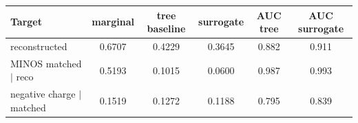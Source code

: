 \begin{tabular}{lccccc}
\toprule
Target & marginal & tree baseline & surrogate & AUC tree & AUC surrogate \\
\midrule
reconstructed & 0.6707 & 0.4229 & 0.3645 & 0.882 & 0.911 \\
MINOS matched $\mid$ reco & 0.5193 & 0.1015 & 0.0600 & 0.987 & 0.993 \\
negative charge $\mid$ matched & 0.1519 & 0.1272 & 0.1188 & 0.795 & 0.839 \\
\bottomrule
\end{tabular}
